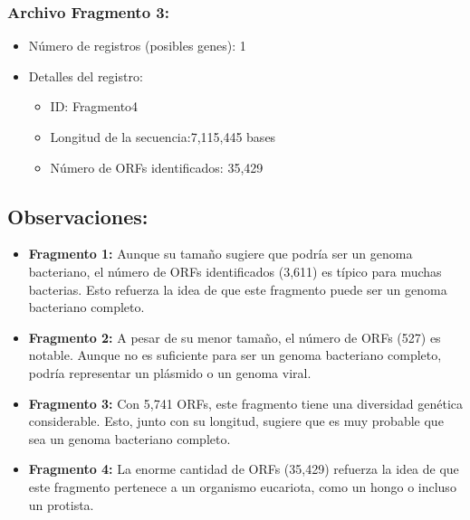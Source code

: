 \subsubsection*{Archivo Fragmento 3:}
\begin{itemize}
\item Número de registros (posibles genes): 1
\item Detalles del registro:
  \begin{itemize}
  \item ID: Fragmento4
  \item Longitud de la secuencia:7,115,445 bases
  \item Número de ORFs identificados: 35,429
  \end{itemize}
\end{itemize}

\subsection*{Observaciones:}
\begin{itemize}
\item \textbf{Fragmento 1:} Aunque su tamaño sugiere que podría ser un genoma bacteriano, el número de ORFs identificados (3,611) es típico para muchas bacterias. Esto refuerza la idea de que este fragmento puede ser un genoma bacteriano completo.
\item \textbf{Fragmento 2:} A pesar de su menor tamaño, el número de ORFs (527) es notable. Aunque no es suficiente para ser un genoma bacteriano completo, podría representar un plásmido o un genoma viral.
\item \textbf{Fragmento 3:} Con 5,741 ORFs, este fragmento tiene una diversidad genética considerable. Esto, junto con su longitud, sugiere que es muy probable que sea un genoma bacteriano completo.
\item \textbf{Fragmento 4:} La enorme cantidad de ORFs (35,429) refuerza la idea de que este fragmento pertenece a un organismo eucariota, como un hongo o incluso un protista.
\end{itemize}
